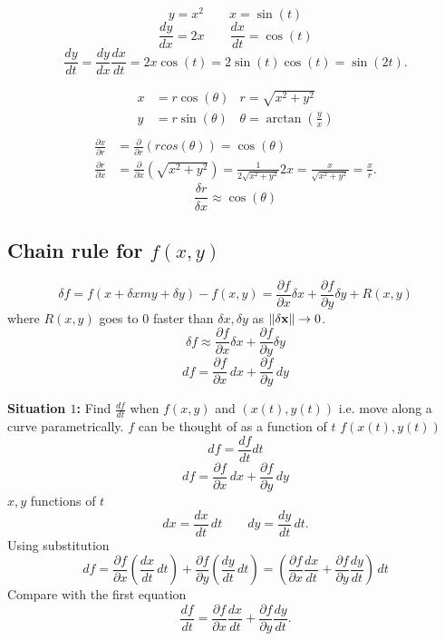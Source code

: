 \documentclass[10pt, a4paper]{article}
\begin{document}
\begin{example}
    \[
    y = x ^ 2\qquad x = \sin(t)
    \]
    \[
    \frac{dy}{dx} = 2x\qquad \frac{dx}{dt} = \cos(t)
    \]
    \[
    \frac{dy}{dt} = \frac{dy}{dx}\frac{dx}{dt} = 2x\cos(t) = 2\sin(t)\cos(t) = \sin(2t).
    \]
\end{example}

\begin{example}[2D polars]
    \begin{align*}
        x &= r\cos(\theta) & r = \sqrt{x ^ 2 + y ^ 2} \\
        y &= r\sin(\theta) & \theta = \arctan\left(\frac{y}{x}\right) \\
    \end{align*}
    \begin{align*}
        \frac{\partial x}{\partial r} &= \frac{\partial}{\partial r}(rcos(\theta)) = \cos(\theta) \\
        \frac{\partial r}{\partial x} &= \frac{\partial}{\partial x}(\sqrt{x ^ 2 + y ^ 2}) = \frac{1}{2\sqrt{x ^ 2 + y ^ 2}}2x = \frac{x}{\sqrt{x ^ 2 + y ^ 2}} = \frac{x}{r}.
    \end{align*}
    \[
    \frac{\delta r}{\delta x} \approx \cos(\theta)
    \]
\end{example}

\subsection{Chain rule for \texorpdfstring{$f(x, y)$}{}}
\[
\delta f = f(x + \delta xm y + \delta y) - f(x, y) = \frac{\partial f}{\partial x}\delta x +  \frac{\partial f}{\partial y}\delta y + R(x, y)
\]
where $R(x, y)$ goes to $0$ faster than $\delta x, \delta y$ as $\|\delta\mathbf{x}\| \rightarrow 0$.
\[
\delta f \approx \frac{\partial f}{\partial x}\delta x + \frac{\partial f}{\partial y}\delta y
\]
\[
df = \frac{\partial f}{\partial x}\,dx + \frac{\partial f}{\partial y}\,dy
\]

\textbf{Situation $1$:}
Find $\frac{df}{dt}$ when $f(x, y)$ and $(x(t), y(t))$ i.e. move along a curve parametrically.
$f$ can be thought of as a function of $t$ $f(x(t), y(t))$
\[
df = \frac{df}{dt}dt
\]
\[
df = \frac{\partial f}{\partial x}\,dx + \frac{\partial f}{\partial y}\,dy
\]
$x, y$ functions of $t$
\[
dx = \frac{dx}{dt}\,dt\qquad dy = \frac{dy}{dt}\,dt.
\]
Using substitution
\[
df = \frac{\partial f}{\partial x}\left(\frac{dx}{dt}\,dt\right) + \frac{\partial f}{\partial y}\left(\frac{dy}{dt}\,dt\right) = \left(\frac{\partial f}{\partial x}\frac{dx}{dt} + \frac{\partial f}{\partial y}\frac{dy}{dt}\right)\,dt
\]
Compare with the first equation
\[
\frac{df}{dt} = \frac{\partial f}{\partial x}\frac{dx}{dt} + \frac{\partial f}{\partial y}\frac{dy}{dt}.
\]
\end{document}
